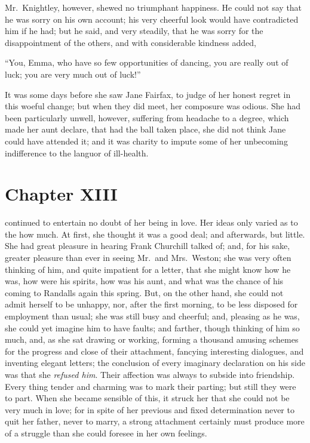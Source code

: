 Mr.\ Knightley, however, shewed no triumphant happiness.  He could
not say that he was sorry on his own account; his very cheerful look
would have contradicted him if he had; but he said, and very steadily,
that he was sorry for the disappointment of the others, and with
considerable kindness added,

``You, Emma, who have so few opportunities of dancing, you are really
out of luck; you are very much out of luck!''

It was some days before she saw Jane Fairfax, to judge of her
honest regret in this woeful change; but when they did meet,
her composure was odious.  She had been particularly unwell, however,
suffering from headache to a degree, which made her aunt declare,
that had the ball taken place, she did not think Jane could have
attended it; and it was charity to impute some of her unbecoming
indifference to the languor of ill-health.



\chapter{Chapter XIII}


 continued to entertain no doubt of her being in love.  Her ideas
only varied as to the how much.  At first, she thought it was a good deal;
and afterwards, but little.  She had great pleasure in hearing Frank
Churchill talked of; and, for his sake, greater pleasure than ever
in seeing Mr.\ and Mrs.\ Weston; she was very often thinking of him,
and quite impatient for a letter, that she might know how he was,
how were his spirits, how was his aunt, and what was the chance
of his coming to Randalls again this spring.  But, on the other hand,
she could not admit herself to be unhappy, nor, after the
first morning, to be less disposed for employment than usual;
she was still busy and cheerful; and, pleasing as he was, she could
yet imagine him to have faults; and farther, though thinking of him
so much, and, as she sat drawing or working, forming a thousand
amusing schemes for the progress and close of their attachment,
fancying interesting dialogues, and inventing elegant letters;
the conclusion of every imaginary declaration on his side was that she
\emph{refused him}.  Their affection was always to subside into friendship.
Every thing tender and charming was to mark their parting;
but still they were to part.  When she became sensible of this,
it struck her that she could not be very much in love; for in spite
of her previous and fixed determination never to quit her father,
never to marry, a strong attachment certainly must produce more
of a struggle than she could foresee in her own feelings.

